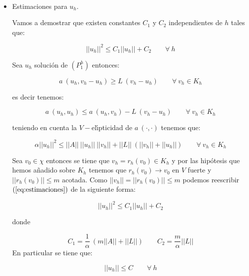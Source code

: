 \begin{demosteorema}
\ \newline
\begin{itemize}
\item Estimaciones para $u_h$.\newline

Vamos a demostrar que existen constantes $C_1$ y $C_2$ independientes de $h$
tales que:

\begin{displaymath}
||u_h||^2 \le C_1 ||u_h|| + C_2 \qquad \forall \ h
\end{displaymath}

Sea $u_h$ soluci\'on de $(P^h_1)$ entonces:

\begin{displaymath}
a\ (u_h,v_h-u_h) \ge L\ (v_h-u_h) \qquad \forall \ v_h \in K_h
\end{displaymath}

es decir tenemos:

\begin{displaymath}
a\ (u_h,u_h) \le a\ (u_h,v_h)- L\ (v_h-u_h) \qquad \forall \ v_h \in K_h
\end{displaymath}

teniendo en cuenta la $V-$el\'{\i}pticidad de $a\ (\cdot ,\cdot)$ tenemos que:

\begin{equation} \label{eq:estimaciones}
\alpha ||u_h||^2 \le ||A||\ ||u_h||\ ||v_h|| + ||L||\ (||v_h||+||u_h||)\qquad
\forall \ v_h \in K_h
\end{equation}

Sea $v_0 \in \chi$ entonces se tiene que $v_h=r_h (v_0)\in K_h$ y por
las hip\'otesis que hemos a\~nadido sobre $K_h$ tenemos que
$r_h(v_0) \to v_0$ en $V$ fuerte y $||r_h(v_0)|| \le m$
acotada. Como $||v_h||=||r_h(v_0)||\le m$ podemos reescribir
$(\ref{eq:estimaciones})$ de la siguiente forma:

\begin{displaymath}
||u_h||^2 \le C_1||u_h|| + C_2
\end{displaymath}

donde

\begin{displaymath}
C_1 = \frac{1}{\alpha}\ (m ||A|| + ||L||)\qquad C_2=\frac{m}{\alpha} ||L||
\end{displaymath}
En particular se tiene que:

\begin{displaymath}
||u_h|| \le C\qquad \forall \ h
\end{displaymath}


\end{itemize}
\end{demosteorema}
